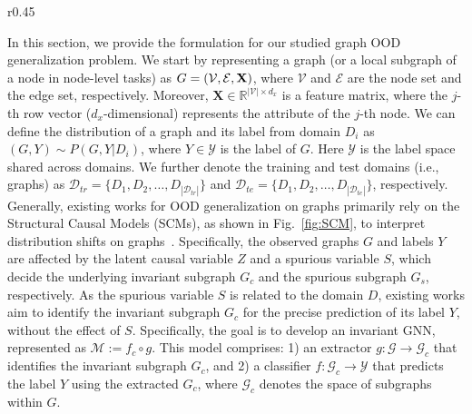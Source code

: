 \begin{wrapfigure}{r}{0.45\textwidth}
\centering
{}
        \caption{The SCMs with distribution shift (left) and without distribution shifts (right).}            \label{fig:SCM}
                    \vspace{-0.05in}
\end{wrapfigure}
In this section, we provide the formulation for our studied graph OOD generalization problem. 
We start by representing a graph (or a local subgraph of a node in node-level tasks) as $G=(\mathcal{V},\mathcal{E},\mathbf{X})$, where $\mathcal{V}$ and $\mathcal{E}$ are the node set and the edge set, respectively. Moreover, $\mathbf{X}\in\mathbb{R}^{|\mathcal{V}|\times d_x}$ is a feature matrix, where the $j$-th row vector ($d_x$-dimensional) represents the attribute of the $j$-th node. 
We can define the distribution of a graph and its label from domain $D_i$ as $(G,Y)\sim P(G,Y|D_i)$, where $Y\in\mathcal{Y}$ is the label of $G$. Here $\mathcal{Y}$ is the label space shared across domains. We further denote the training and test domains (i.e., graphs) as $\mathcal{D}_{tr}=\{D_1,D_2, \dotsc, D_{|\mathcal{D}_{tr}|}\}$ and $\mathcal{D}_{te}=\{D_1,D_2, \dotsc, D_{|\mathcal{D}_{te}|}\}$, respectively. Generally, existing works for OOD generalization on graphs primarily rely on the Structural Causal Models (SCMs), as shown in Fig.~\ref{fig:SCM}, to interpret distribution shifts on graphs~\citep{chen2022learning,chen2023does}. Specifically, the observed graphs \( G \) and labels \( Y \) are affected by the latent causal variable \( Z \) and a spurious variable \( S \), which decide the underlying invariant subgraph \( G_c \) and the spurious subgraph \( G_s \), respectively. As the spurious variable $S$ is related to the domain $D$, existing works aim to identify the invariant subgraph $G_c$ for the precise prediction of its label $Y$, without the effect of $S$. Specifically, the goal is to develop an invariant GNN, represented as \( \mathcal{M}:= f_c \circ g \). This model comprises: 1) an extractor \( g: \mathcal{G} \to \mathcal{G}_c \) that identifies the invariant subgraph \( G_{c} \), and 2) a classifier \( f:  \mathcal{G}_c \to \mathcal{Y} \) that predicts the label \( Y \) using the extracted \( G_{c} \), where \( \mathcal{G}_c \) denotes the space of subgraphs within \( G \). 
